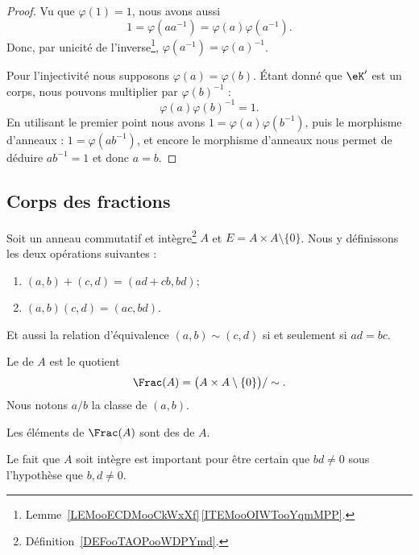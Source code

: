 \begin{proof}
    Vu que \( \varphi(1)=1\), nous avons aussi
    \begin{equation}
        1=\varphi(aa^{-1})=\varphi(a)\varphi(a^{-1}).
    \end{equation}
    Donc, par unicité de l'inverse\footnote{Lemme~\ref{LEMooECDMooCkWxXf}\,\ref{ITEMooOIWTooYqmMPP}.}, \( \varphi(a^{-1})=\varphi(a)^{-1}\).

    Pour l'injectivité nous supposons \( \varphi(a)=\varphi(b)\). Étant donné que \( \eK'\) est un corps, nous pouvons multiplier par \( \varphi(b)^{-1}\) :
    \begin{equation}
        \varphi(a)\varphi(b)^{-1}=1.
    \end{equation}
    En utilisant le premier point nous avons \( 1=\varphi(a)\varphi(b^{-1})\), puis le morphisme d'anneaux : \( 1=\varphi(ab^{-1})\), et encore le morphisme d'anneaux nous permet de déduire \( ab^{-1}=1\) et donc \(a=b\).
\end{proof}

\subsection{Corps des fractions}

\begin{definition}       \label{DEFooGJYXooOiJQvP}
    Soit un anneau commutatif et intègre\footnote{Définition~\ref{DEFooTAOPooWDPYmd}.} \( A\) et \( E=A\times A\setminus\{ 0 \}\). Nous y définissons les deux opérations suivantes :
    \begin{enumerate}
        \item
            \( (a,b)+(c,d)=(ad+cb,bd)\);
        \item
            \( (a,b)(c,d)=(ac,bd)\).
    \end{enumerate}
    Et aussi la relation d'équivalence \( (a,b)\sim(c,d)\) si et seulement si \( ad=bc\).

    Le  de \( A\) est le quotient
    \begin{equation}
        \Frac(A)=\big( A\times A\setminus\{ 0 \} \big)/\sim.
    \end{equation}
    Nous notons \( a/b\) la classe de \( (a,b)\).

    Les éléments de \( \Frac(A)\) sont des  de \( A\).
\end{definition}
Le fait que \( A\) soit intègre est important pour être certain que \( bd\neq 0\) sous l'hypothèse que \( b,d\neq 0\).

